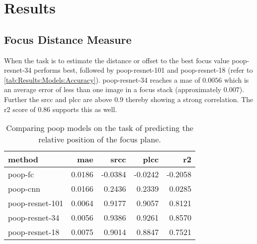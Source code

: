 \chapter{Results}
\label{ch:Results}


\section{Focus Distance Measure}
\label{sec:Results:FocusDistance}

When the task is to estimate the distance or offset to the best focus value \acs{poop}-\acs{resnet}-34 performs best, followed by \acs{poop}-\acs{resnet}-101 and \acs{poop}-\acs{resnet}-18 (refer to \autoref{tab:Results:Models:Accuracy}). \Acs{poop}-\acs{resnet}-34 reaches a \ac{mae} of $0.0056$ which is an average error of less than one image in a focus stack (approximately $0.007$). Further the \ac{srcc} and \ac{plcc} are above $0.9$ thereby showing a strong correlation. The \ac{r2} score of $0.86$ supports this as well.

\begin{table}
    \centering
    \caption{Comparing \acs{poop} models on the task of predicting the relative position of the focus plane.}
    \begin{tabular}{|l|rrrr|}
        \hline
        method          & \acs{mae} & \acs{srcc} & \acs{plcc} & \acs{r2} \\
        \hline
        \acs{poop}-\acs{fc}        & 0.0186 & -0.0384 & -0.0242 & -0.2058 \\
        \acs{poop}-\acs{cnn}        & 0.0166 &  0.2436 &  0.2339 &  0.0285 \\
        \acs{poop}-\acs{resnet}-101      & 0.0064 &  0.9177 &  0.9057 &  0.8121 \\
        \acs{poop}-\acs{resnet}-34       & 0.0056 &  0.9386 &  0.9261 &  0.8570 \\
        \acs{poop}-\acs{resnet}-18       & 0.0075 &  0.9014 &  0.8847 &  0.7521 \\
        \hline
    \end{tabular}
    \label{tab:Results:Models:Accuracy}
\end{table}

